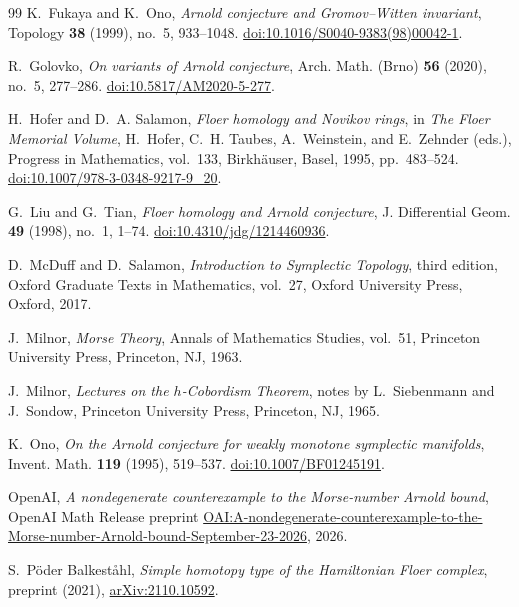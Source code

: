 \begin{thebibliography}{99}
K.~Fukaya and K.~Ono,
\emph{Arnold conjecture and Gromov--Witten invariant},
Topology \textbf{38} (1999), no.~5, 933--1048.
\href{https://doi.org/10.1016/S0040-9383(98)00042-1}{doi:10.1016/S0040-9383(98)00042-1}.

R.~Golovko,
\emph{On variants of Arnold conjecture},
Arch. Math. (Brno) \textbf{56} (2020), no.~5, 277--286.
\href{https://doi.org/10.5817/AM2020-5-277}{doi:10.5817/AM2020-5-277}.

H.~Hofer and D.~A. Salamon,
\emph{Floer homology and Novikov rings},
in \emph{The Floer Memorial Volume},
H.~Hofer, C.~H. Taubes, A.~Weinstein, and E.~Zehnder (eds.),
Progress in Mathematics, vol.~133,
Birkh\"auser, Basel, 1995, pp.~483--524.
\href{https://doi.org/10.1007/978-3-0348-9217-9_20}{doi:10.1007/978-3-0348-9217-9\_20}.

G.~Liu and G.~Tian,
\emph{Floer homology and Arnold conjecture},
J. Differential Geom. \textbf{49} (1998), no.~1, 1--74.
\href{https://doi.org/10.4310/jdg/1214460936}{doi:10.4310/jdg/1214460936}.

D.~McDuff and D.~Salamon,
\emph{Introduction to Symplectic Topology}, third edition,
Oxford Graduate Texts in Mathematics, vol.~27,
Oxford University Press, Oxford, 2017.

J.~Milnor,
\emph{Morse Theory},
Annals of Mathematics Studies, vol.~51,
Princeton University Press, Princeton, NJ, 1963.

J.~Milnor,
\emph{Lectures on the $h$-Cobordism Theorem},
notes by L.~Siebenmann and J.~Sondow,
Princeton University Press, Princeton, NJ, 1965.

K.~Ono,
\emph{On the Arnold conjecture for weakly monotone symplectic manifolds},
Invent. Math. \textbf{119} (1995), 519--537.
\href{https://doi.org/10.1007/BF01245191}{doi:10.1007/BF01245191}.

OpenAI,
\emph{A nondegenerate counterexample to the Morse-number Arnold bound},
OpenAI Math Release preprint
\href{https://github.com/openai/math/blob/main/preprints/A-nondegenerate-counterexample-to-the-Morse-number-Arnold-bound-September-23-2026/paper.pdf}{OAI:A-nondegenerate-counterexample-to-the-Morse-number-Arnold-bound-September-23-2026},
2026.

S.~P\"oder Balkest\aa hl,
\emph{Simple homotopy type of the Hamiltonian Floer complex},
preprint (2021), \href{https://arxiv.org/abs/2110.10592}{arXiv:2110.10592}.


\end{thebibliography}
